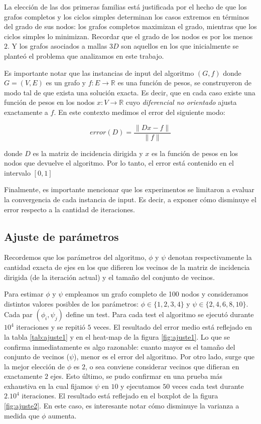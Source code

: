 \documentclass[conference,compsoc,a4paper]{IEEEtran}
\begin{document}
La elección de las dos primeras familias está justificada por el hecho 
de que los grafos completos y los ciclos simples determinan los casos 
extremos en términos del grado de sus nodos: los grafos completos 
maximizan el grado, mientras que los ciclos simples lo minimizan. 
Recordar que el grado de los nodos es por los menos $2$. Y los grafos 
asociados a mallas $3D$ son aquellos en los que inicialmente se planteó 
el problema que analizamos en este trabajo.

\smallskip

Es importante notar que las instancias de input del algoritmo $(G,f)$ 
donde $G=(V,E)$ es un grafo y $f: E \rightarrow \mathbb{R}$ es una 
función de pesos, se construyeron de modo tal de que exista una 
solución exacta. Es decir, que en cada caso existe una función de pesos 
en los nodos $x: V \rightarrow \mathbb{R}$ cuyo \textit{diferencial no 
orientado} ajusta exactamente a $f$. En este contexto medimos el error 
del siguiente modo:

$$error(D) = \frac{\|Dx-f\|}{\|f\|}$$

donde $D$ es la matriz de incidencia dirigida y $x$ es la función de 
pesos en los nodos que devuelve el algoritmo. Por lo tanto, el error 
está contenido en el intervalo $[0,1]$

\smallskip

Finalmente, es importante mencionar que los experimentos se limitaron a 
evaluar la convergencia de cada instancia de input. Es decir, a exponer 
cómo disminuye el error respecto a la cantidad de iteraciones.

\subsection{Ajuste de parámetros}

Recordemos que los parámetros del algoritmo, $\phi$ y $\psi$ denotan 
respectivamente la cantidad exacta de ejes en los que difieren los 
vecinos de la matriz de incidencia dirigida (de la iteración actual) y 
el tamaño del conjunto de vecinos.

\smallskip

Para estimar $\phi$ y $\psi$ empleamos un grafo completo de 100 
nodos y consideramos distintos valores posibles de los parámetros: 
$\phi \in \{1,2,3,4\}$ y $\psi \in \{2,4,6,8,10\}$. Cada par 
$(\phi_i, \psi_j)$ define un test. Para cada test el algoritmo se 
ejecutó durante $10^4$ iteraciones y se repitió $5$ veces. El resultado 
del error medio está reflejado en la tabla \ref{tab:ajuste1} y en el 
heat-map de la figura \ref{fig:ajuste1}. Lo que se confirma 
inmediatamente es algo razonable: cuanto mayor es el tamaño del 
conjunto de vecinos ($\psi$), menor es el error del algoritmo. Por 
otro lado, surge que la mejor elección de $\phi$ es $2$, o sea 
conviene considerar vecinos que difieran en exactamente $2$ ejes. Esto 
último, se pudo confirmar en una prueba más exhaustiva en la cual 
fijamos $\psi$ en $10$ y ejecutamos $50$ veces cada test durante 
$2 . 10^4$ iteraciones. El resultado está reflejado en el boxplot de la 
figura \ref{fig:ajuste2}. En este caso, es interesante notar cómo 
disminuye la varianza a medida que $\phi$ aumenta.
\end{document}

